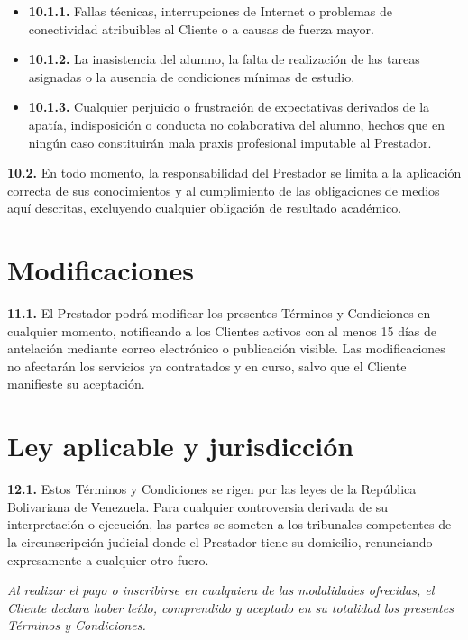 \documentclass[12pt, letterpaper]{article}
\begin{document}
\begin{itemize}[leftmargin=1.5em, itemsep=3pt, topsep=4pt]
  \item \textbf{10.1.1.} Fallas técnicas, interrupciones de Internet o problemas de conectividad atribuibles al Cliente o a causas de fuerza mayor.
  \item \textbf{10.1.2.} La inasistencia del alumno, la falta de realización de las tareas asignadas o la ausencia de condiciones mínimas de estudio.
  \item \textbf{10.1.3.} Cualquier perjuicio o frustración de expectativas derivados de la apatía, indisposición o conducta no colaborativa del alumno, hechos que en ningún caso constituirán mala praxis profesional imputable al Prestador.
\end{itemize}

\vspace{4pt}
\noindent\textbf{10.2.} En todo momento, la responsabilidad del Prestador se limita a la aplicación correcta de sus conocimientos y al cumplimiento de las obligaciones de medios aquí descritas, excluyendo cualquier obligación de resultado académico.

\section{Modificaciones}

\noindent\textbf{11.1.} El Prestador podrá modificar los presentes Términos y Condiciones en cualquier momento, notificando a los Clientes activos con al menos 15 días de antelación mediante correo electrónico o publicación visible. Las modificaciones no afectarán los servicios ya contratados y en curso, salvo que el Cliente manifieste su aceptación.

\section{Ley aplicable y jurisdicción}

\noindent\textbf{12.1.} Estos Términos y Condiciones se rigen por las leyes de la República Bolivariana de Venezuela. Para cualquier controversia derivada de su interpretación o ejecución, las partes se someten a los tribunales competentes de la circunscripción judicial donde el Prestador tiene su domicilio, renunciando expresamente a cualquier otro fuero.

\vspace{12pt}
\begin{cuadroteorianobg}
  \centering\small\itshape
  Al realizar el pago o inscribirse en cualquiera de las modalidades ofrecidas, el Cliente declara haber leído, comprendido y aceptado en su totalidad los presentes Términos y Condiciones.
\end{cuadroteorianobg}
\end{document}

